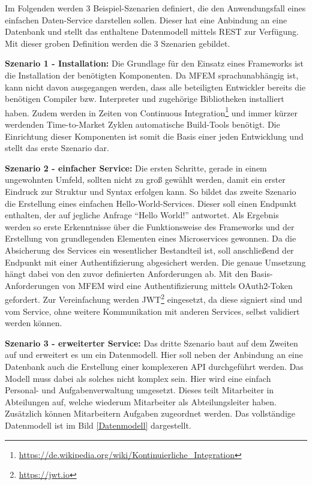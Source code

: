 Im Folgenden werden 3 Beispiel-Szenarien definiert, die den Anwendungsfall eines einfachen Daten-Service darstellen sollen. Dieser hat eine Anbindung an eine Datenbank und stellt das enthaltene Datenmodell mittels \ac{REST} zur Verfügung. Mit dieser groben Definition werden die 3 Szenarien gebildet.

\textbf{Szenario 1 - Installation:} Die Grundlage für den Einsatz eines Frameworks ist die Installation der benötigten Komponenten. Da \ac{MFEM} sprachunabhängig ist, kann nicht davon ausgegangen werden, dass alle beteiligten Entwickler bereits die benötigen Compiler bzw. Interpreter und zugehörige Bibliotheken installiert haben. Zudem werden in Zeiten von Continuous Integration\footnote{\url{https://de.wikipedia.org/wiki/Kontinuierliche_Integration}} und immer kürzer werdenden Time-to-Market Zyklen automatische Build-Tools benötigt. Die Einrichtung dieser Komponenten ist somit die Basis einer jeden Entwicklung und stellt das erste Szenario dar.


\textbf{Szenario 2 - einfacher Service:} Die ersten Schritte, gerade in einem ungewohnten Umfeld, sollten nicht zu groß gewählt werden, damit ein erster Eindruck zur Struktur und Syntax erfolgen kann. So bildet das zweite Szenario die Erstellung eines einfachen Hello-World-Services. Dieser soll einen Endpunkt enthalten, der auf jegliche Anfrage \enquote{Hello World!} antwortet. Als Ergebnis werden so erste Erkenntnisse über die Funktionsweise des Frameworks und der Erstellung von grundlegenden Elementen eines Microservices gewonnen. Da die Absicherung des Services ein wesentlicher Bestandteil ist, soll anschließend der Endpunkt mit einer Authentifizierung abgesichert werden. Die genaue Umsetzung hängt dabei von den zuvor definierten Anforderungen ab. 
Mit den Basis-Anforderungen von \ac{MFEM} wird eine Authentifizierung mittels OAuth2-Token gefordert. Zur Vereinfachung werden \ac{JWT}\footnote{\url{https://jwt.io}} eingesetzt, da diese signiert sind und vom Service, ohne weitere Kommunikation mit anderen Services, selbst validiert werden können.   


\textbf{Szenario 3 - erweiterter Service:} Das dritte Szenario baut auf dem Zweiten auf und erweitert es um ein Datenmodell. Hier soll neben der Anbindung an eine Datenbank auch die Erstellung einer komplexeren API durchgeführt werden. Das Modell muss dabei als solches nicht komplex sein. Hier wird eine einfach Personal- und Aufgabenverwaltung umgesetzt. Dieses teilt Mitarbeiter in Abteilungen auf, welche wiederum Mitarbeiter als Abteilungsleiter haben. Zusätzlich können Mitarbeitern Aufgaben zugeordnet werden. Das vollständige Datenmodell ist im Bild \ref{Datenmodell} dargestellt.

